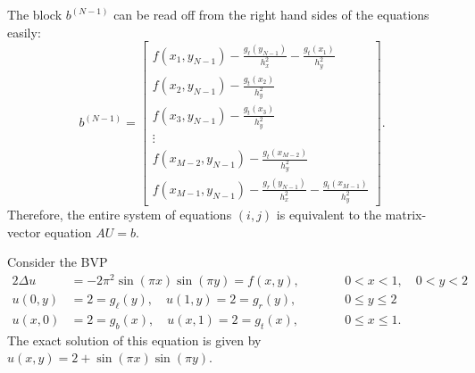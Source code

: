 \documentclass{homework}
\begin{document}
\begin{alphaparts}
\begin{equation*}
		\end{equation*}
		The block $b^{(N-1)}$ can be read off from the right hand sides of the equations easily:
		\begin{equation*}
			b^{(N-1)} = \left[\begin{matrix}
				f(x_1,y_{N-1}) - \frac{g_\ell(y_{N-1})}{h_x^2} - \frac{g_t(x_1)}{h_y^2} \\
				f(x_2,y_{N-1}) - \frac{g_t(x_2)}{h_y^2} \\
				f(x_3,y_{N-1}) - \frac{g_t(x_3)}{h_y^2} \\
				\vdots \\
				f(x_{M-2},y_{N-1}) - \frac{g_t(x_{M-2})}{h_y^2}\\
				f(x_{M-1},y_{N-1}) - \frac{g_r(y_{N-1})}{h_x^2} - \frac{g_t(x_{M-1})}{h_y^2}
			\end{matrix}\right].
		\end{equation*}
		Therefore, the entire system of equations $(i,j)$ is equivalent to the matrix-vector equation $AU = b$.
	\end{alphaparts}
	
	\question
	Consider the BVP
	\begin{alignat*}{2}
		\Delta u &= -2\pi^2\sin(\pi x)\sin(\pi y) = f(x,y), &\qquad &0<x<1, \quad 0<y<2 \\
		u(0,y) &= 2 = g_\ell(y), \quad u(1, y) = 2 = g_r(y), & \qquad &0 \le y \le 2\\
		u(x,0) &= 2 = g_b(x), \quad u(x, 1) = 2 = g_t(x), & \qquad &0 \le x \le 1. 
	\end{alignat*}
	The exact solution of this equation is given by $u(x,y) = 2 +\sin(\pi x)\sin(\pi y)$.
	
\end{document}
